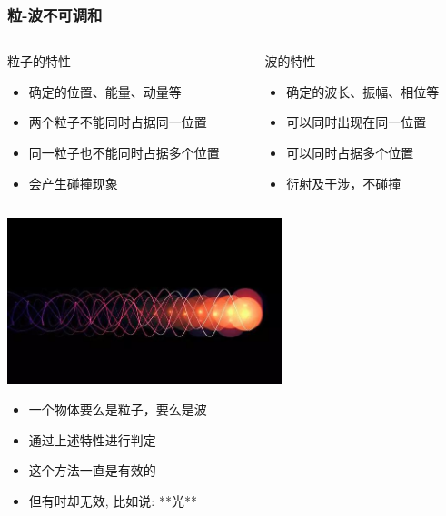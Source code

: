 \begin{frame}
    \frametitle{粒-波不可调和}
	\begin{columns}
		\begin{column}[t]{0.46\linewidth}
			粒子的特性
			\begin{itemize}
				\item 确定的位置、能量、动量等
				\item 两个粒子不能同时占据同一位置
				\item 同一粒子也不能同时占据多个位置
				\item 会产生碰撞现象
			\end{itemize}
		\end{column}
		\begin{column}[t]{0.46\linewidth}
			波的特性
			\vspace{1ex}
			\begin{itemize}
				\item 确定的波长、振幅、相位等
				\item 可以同时出现在同一位置
				\item 可以同时占据多个位置
				\item 衍射及干涉，不碰撞
			\end{itemize}
		\end{column}
	\end{columns}
\end{frame}

\begin{frame} 
    \begin{center}
        \includegraphics[width=0.6\textwidth]{figs/2021-12-02-15-26-40.png}
    \end{center}
    \begin{itemize}
        \item 一个物体要么是粒子，要么是波
        \item 通过上述特性进行判定
        \item 这个方法一直是有效的
        \item 但有时却无效, 比如说: **光** 
    \end{itemize}
\end{frame}

